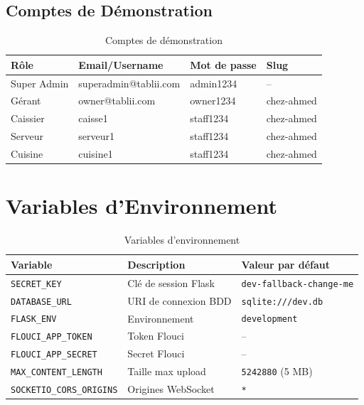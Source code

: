 \documentclass[12pt,a4paper]{report}
\begin{document}
\section{Comptes de Démonstration}

\begin{table}[H]
    \centering
    \begin{tabularx}{\textwidth}{l l l l}
        \toprule
        \rowcolor{primary!10}
        \textbf{Rôle} & \textbf{Email/Username} & \textbf{Mot de passe} & \textbf{Slug} \\
        \midrule
        Super Admin & superadmin@tablii.com & admin1234 & -- \\
        Gérant & owner@tablii.com & owner1234 & chez-ahmed \\
        Caissier & caisse1 & staff1234 & chez-ahmed \\
        Serveur & serveur1 & staff1234 & chez-ahmed \\
        Cuisine & cuisine1 & staff1234 & chez-ahmed \\
        \bottomrule
    \end{tabularx}
    \caption{Comptes de démonstration}
    \label{tab:demo-accounts}
\end{table}

\chapter{Variables d'Environnement}

\begin{table}[H]
    \centering
    \begin{tabularx}{\textwidth}{l X l}
        \toprule
        \rowcolor{primary!10}
        \textbf{Variable} & \textbf{Description} & \textbf{Valeur par défaut} \\
        \midrule
        \texttt{SECRET\_KEY} & Clé de session Flask & \texttt{dev-fallback-change-me} \\
        \texttt{DATABASE\_URL} & URI de connexion BDD & \texttt{sqlite:///dev.db} \\
        \texttt{FLASK\_ENV} & Environnement & \texttt{development} \\
        \texttt{FLOUCI\_APP\_TOKEN} & Token Flouci & -- \\
        \texttt{FLOUCI\_APP\_SECRET} & Secret Flouci & -- \\
        \texttt{MAX\_CONTENT\_LENGTH} & Taille max upload & \texttt{5242880} (5 MB) \\
        \texttt{SOCKETIO\_CORS\_ORIGINS} & Origines WebSocket & \texttt{*} \\
        \bottomrule
    \end{tabularx}
    \caption{Variables d'environnement}
    \label{tab:env-vars}
\end{table}
\end{document}
